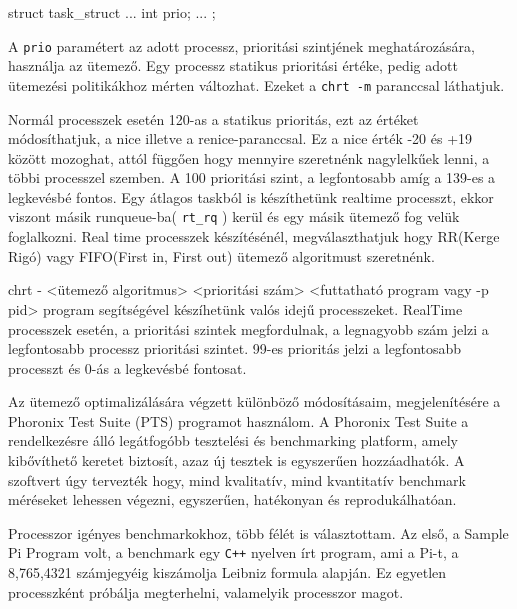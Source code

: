 \begin{cpp}
struct task_struct {
...	
		int				prio;
...
};
\end{cpp}

A \texttt{prio} paramétert az adott processz, prioritási szintjének meghatározására, használja az ütemező. Egy processz statikus prioritási értéke, pedig adott ütemezési politikákhoz mérten változhat. Ezeket a \texttt{chrt -m} paranccsal láthatjuk.
Normál processzek esetén 120-as a statikus prioritás, ezt az értéket módosíthatjuk, a nice illetve a renice-paranccsal.
Ez a nice érték -20 és +19 között mozoghat, attól függően hogy mennyire szeretnénk nagylelkűek lenni, a többi processzel szemben.
A 100 prioritási szint, a legfontosabb amíg a 139-es a legkevésbé fontos.
Egy átlagos taskból is készíthetünk realtime processzt, ekkor viszont másik runqueue-ba( \texttt{rt\_rq} ) kerül és egy másik ütemező fog velük foglalkozni. Real time processzek készítésénél, megválaszthatjuk hogy RR(Kerge Rigó) vagy FIFO(First in, First out) ütemező algoritmust szeretnénk. 

chrt - <ütemező algoritmus> <prioritási szám> <futtatható program vagy -p pid>
program segítségével készíhetünk valós idejű processzeket.
RealTime processzek esetén, a prioritási szintek megfordulnak, a legnagyobb szám jelzi a legfontosabb processz prioritási szintet.
99-es prioritás jelzi a legfontosabb processzt és 0-ás a legkevésbé fontosat.

Az ütemező optimalizálására végzett különböző módosításaim, megjelenítésére a Phoronix Test Suite (PTS) programot használom.
A Phoronix Test Suite a rendelkezésre álló legátfogóbb tesztelési és benchmarking platform, amely kibővíthető keretet biztosít, azaz új tesztek is egyszerűen hozzáadhatók.
A szoftvert úgy tervezték hogy, mind kvalitatív, mind kvantitatív benchmark méréseket lehessen végezni, egyszerűen, hatékonyan és reprodukálhatóan.
  
Processzor igényes benchmarkokhoz, több félét is választottam. Az első, a Sample Pi Program volt, a benchmark egy \texttt{C++} nyelven írt program, ami a Pi-t, a 8,765,4321 számjegyéig kiszámolja Leibniz formula alapján. Ez egyetlen processzként próbálja megterhelni, valamelyik processzor magot.

